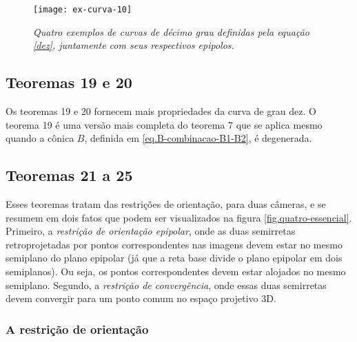 \begin{figure}[!htb]
\centering
\texttt{[image: ex-curva-10]}
\caption{\textit{Quatro exemplos de curvas de décimo grau definidas pela equação \ref{dez}, juntamente com seus respectivos epipolos.}}
\label{curva-10}
\end{figure}

\subsection{Teoremas 19 e 20}

Os teoremas 19 e 20 fornecem mais propriedades da curva de grau dez. O teorema 19 é uma versão mais completa do teorema 7 que se aplica mesmo quando a cônica $B$, definida em \ref{eq.B-combinacao-B1-B2}, é degenerada.

\subsection{Teoremas 21 a 25}

Esses teoremas tratam das restrições de orientação, para duas câmeras, e se resumem em dois fatos que podem ser visualizados na figura \ref{fig.quatro-essencial}. Primeiro, a {\it restrição de orientação epipolar}, onde as duas semirretas retroprojetadas por pontos correspondentes nas imagens devem estar no mesmo semiplano do plano epipolar (já que a reta base divide o plano epipolar em dois semiplanos). Ou seja, os pontos correspondentes devem estar alojados no mesmo semiplano. Segundo, a {\it restrição de convergência}, onde essas duas semirretas devem convergir para um ponto comum no espaço projetivo 3D.  

\subsubsection{A restrição de orientação}


